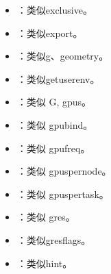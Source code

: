\documentclass[a4paper,12pt,english]{sphinxmanual}
\begin{document}
\begin{itemize}
\item {} 
\sphinxAtStartPar
{}：类似\sphinxhyphen{}\sphinxhyphen{}exclusive。

\item {} 
\sphinxAtStartPar
{}：类似\sphinxhyphen{}\sphinxhyphen{}export。

\item {} 
\sphinxAtStartPar
{}：类似\sphinxhyphen{}g、\sphinxhyphen{}\sphinxhyphen{}geometry。

\item {} 
\sphinxAtStartPar
{}：类似\sphinxhyphen{}\sphinxhyphen{}get\sphinxhyphen{}user\sphinxhyphen{}env。

\item {} 
\sphinxAtStartPar
{}：类似 \sphinxhyphen{}G, \sphinxhyphen{}\sphinxhyphen{}gpus。

\item {} 
\sphinxAtStartPar
{}：类似 \sphinxhyphen{}\sphinxhyphen{}gpu\sphinxhyphen{}bind。

\item {} 
\sphinxAtStartPar
{}：类似 \sphinxhyphen{}\sphinxhyphen{}gpu\sphinxhyphen{}freq。

\item {} 
\sphinxAtStartPar
{}：类似 \sphinxhyphen{}\sphinxhyphen{}gpus\sphinxhyphen{}per\sphinxhyphen{}node。

\item {} 
\sphinxAtStartPar
{}：类似 \sphinxhyphen{}\sphinxhyphen{}gpus\sphinxhyphen{}per\sphinxhyphen{}task。

\item {} 
\sphinxAtStartPar
{}：类似 \sphinxhyphen{}\sphinxhyphen{}gres。

\item {} 
\sphinxAtStartPar
{}：类似\sphinxhyphen{}\sphinxhyphen{}gres\sphinxhyphen{}flags。

\item {} 
\sphinxAtStartPar
{}：类似\sphinxhyphen{}\sphinxhyphen{}hint。


\end{itemize}
\end{document}
